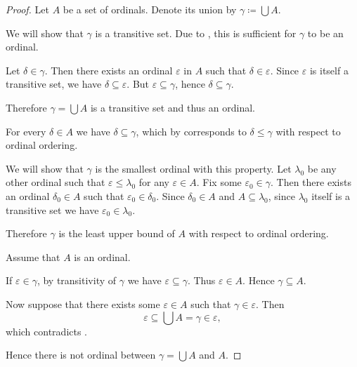 \begin{proof}
   Let \( A \) be a set of ordinals. Denote its union by \( \gamma \coloneqq \bigcup A \).

  We will show that \( \gamma \) is a transitive set. Due to , this is sufficient for \( \gamma \) to be an ordinal.

  Let \( \delta \in \gamma \). Then there exists an ordinal \( \varepsilon \) in \( A \) such that \( \delta \in \varepsilon \). Since \( \varepsilon \) is itself a transitive set, we have \( \delta \subseteq \varepsilon \). But \( \varepsilon \subseteq \gamma \), hence \( \delta \subseteq \gamma \).

  Therefore \( \gamma = \bigcup A \) is a transitive set and thus an ordinal.

   For every \( \delta \in A \) we have \( \delta \subseteq \gamma \), which by  corresponds to \( \delta \leq \gamma \) with respect to ordinal ordering.

  We will show that \( \gamma \) is the smallest ordinal with this property. Let \( \lambda_0 \) be any other ordinal such that \( \varepsilon \leq \lambda_0 \) for any \( \varepsilon \in A \). Fix some \( \varepsilon_0 \in \gamma \). Then there exists an ordinal \( \delta_0 \in A \) such that \( \varepsilon_0 \in \delta_0 \). Since \( \delta_0 \in A \) and \( A \subseteq \lambda_0 \), since \( \lambda_0 \) itself is a transitive set we have \( \varepsilon_0 \in \lambda_0 \).

  Therefore \( \gamma \) is the least upper bound of \( A \) with respect to ordinal ordering.

   Assume that \( A \) is an ordinal.

  If \( \varepsilon \in \gamma \), by transitivity of \( \gamma \) we have \( \varepsilon \subseteq \gamma \). Thus \( \varepsilon \in A \). Hence \( \gamma \subseteq A \).

  Now suppose that there exists some \( \varepsilon \in A \) such that \( \gamma \in \varepsilon \). Then
  \begin{equation*}
    \varepsilon \subseteq \bigcup A = \gamma \in \varepsilon,
  \end{equation*}
  which contradicts .

  Hence there is not ordinal between \( \gamma = \bigcup A \) and \( A \).
\end{proof}

